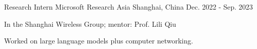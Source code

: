 \documentclass[11pt, a4paper]{awesome-cv}
\begin{document}
\begin{cventries}
	
	\cventry
	{Research Intern} %
	{Microsoft Research Asia} %
	{Shanghai, China} %
	{Dec. 2022 - Sep. 2023} %
	{
		\begin{cvitems} %
			\item {In the Shanghai Wireless Group; mentor: Prof. Lili Qiu}
			\item {Worked on large language models plus computer networking.}
		\end{cvitems}
	}
	
\end{cventries}
\end{document}
